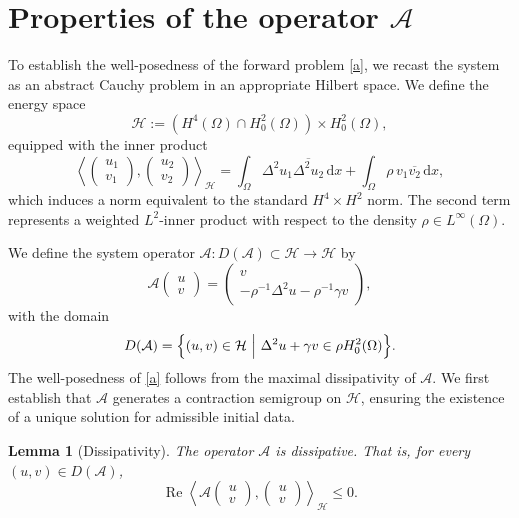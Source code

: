 \documentclass[12pt,reqno]{amsart}
\newtheorem{lemm}[theo]{Lemma}
\numberwithin{equation}{section}
\begin{document}
	
	
	
	
	
	
	
	
	
	
	
	\section{Properties of the operator \( \mathcal{A} \) \label{sect2}}
	
	To establish the well-posedness of the forward problem \eqref{a}, we recast the system as an abstract Cauchy problem in an appropriate Hilbert space. We define the energy space
	\[
	\mathcal{H} := \left( H^4(\Omega) \cap H_0^2(\Omega) \right) \times H_0^2(\Omega),
	\]
	equipped with the inner product
	\[
	\left\langle \begin{pmatrix} u_1 \\ v_1 \end{pmatrix}, \begin{pmatrix} u_2 \\ v_2 \end{pmatrix} \right\rangle_{\mathcal{H}} = \int_\Omega \Delta^2 u_1  \overline{\Delta^2 u_2} \, \mathrm{d}x + \int_\Omega \rho \, v_1 \overline{v_2} \, \mathrm{d}x,
	\]
	which induces a norm equivalent to the standard $H^4 \times H^2$ norm. The second term represents a weighted $L^2$-inner product with respect to the density $\rho \in L^\infty(\Omega)$.
	
	We define the system operator $\mathcal{A} : D(\mathcal{A}) \subset \mathcal{H} \to \mathcal{H}$ by
	\[
	\mathcal{A} \begin{pmatrix} u \\ v \end{pmatrix} = \begin{pmatrix} v \\ -\rho^{-1} \Delta^2 u - \rho^{-1} \gamma v \end{pmatrix},
	\]
	with the domain
	\[
	D(\mathcal{A}) = \Bigl\{ (u, v) \in \mathcal{H} \ \Big|\ \Delta^2 u + \gamma v \in \rho H_0^2(\Omega) \Bigr\}.
	\]
	The well-posedness of \eqref{a} follows from the maximal dissipativity of $\mathcal{A}$. We first establish that $\mathcal{A}$ generates a contraction semigroup on $\mathcal{H}$, ensuring the existence of a unique solution for admissible initial data.
	
	\begin{lemm}[Dissipativity] \label{lemm1}
		The operator $\mathcal{A}$ is dissipative. That is, for every $(u, v) \in D(\mathcal{A})$, 
		\[
		\operatorname{Re} \left\langle \mathcal{A} \begin{pmatrix} u \\ v \end{pmatrix}, \begin{pmatrix} u \\ v \end{pmatrix} \right\rangle_{\mathcal{H}} \leq 0.
		\]
	\end{lemm}
	
\end{document}
